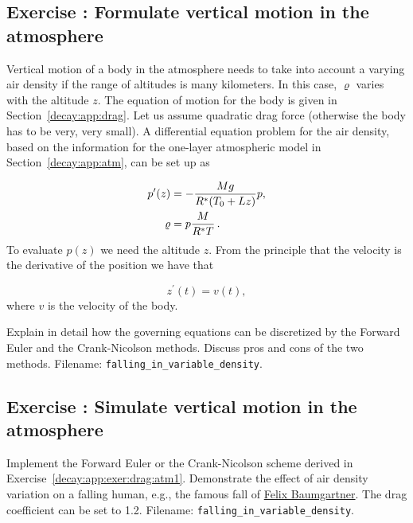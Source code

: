 \documentclass[%
oneside,                 %
final,                   %
10pt]{article}
\newenvironment{doconceexercise}{}{}
\newcounter{doconceexercisecounter}
\begin{document}
\begin{doconceexercise}

\subsection*{Exercise \thedoconceexercisecounter: Formulate vertical motion in the atmosphere}

\label{decay:app:exer:drag:atm1}

Vertical motion of a body in the atmosphere needs to take into
account a varying air density if the range of altitudes is
many kilometers. In this case, $\varrho$ varies with the altitude $z$.
The equation of motion for the body is given in
Section~\ref{decay:app:drag}. Let us assume quadratic drag force
(otherwise the body has to be very, very small).
A differential equation problem for the air density, based on
the information for the one-layer atmospheric model in
Section~\ref{decay:app:atm}, can be set up as

\begin{align}
p^{\prime}(z) &= -\frac{Mg}{R^*(T_0+Lz)} p,\\ 
\varrho &= p \frac{M}{R^*T}
\tp
\end{align}
To evaluate $p(z)$ we need the altitude $z$. From the principle that the
velocity is the derivative of the position we have that

\begin{equation}
z^{\prime}(t) = v(t),
\end{equation}
where $v$ is the velocity of the body.

Explain in detail how the governing equations can be discretized
by the Forward Euler and the Crank-Nicolson methods.
Discuss pros and cons of the two methods.
\noindent Filename: \Verb!falling_in_variable_density!.

\end{doconceexercise}




\begin{doconceexercise}

\subsection*{Exercise \thedoconceexercisecounter: Simulate vertical motion in the atmosphere}

\label{decay:app:exer:drag:atm2}

Implement the Forward Euler or the Crank-Nicolson scheme
derived in Exercise~\ref{decay:app:exer:drag:atm1}.
Demonstrate the effect of air density variation on a falling
human, e.g., the famous fall of \href{{http://en.wikipedia.org/wiki/Felix_Baumgartner}}{Felix Baumgartner}. The drag coefficient can be set to 1.2.
\noindent Filename: \Verb!falling_in_variable_density!.

\end{doconceexercise}
\end{document}
